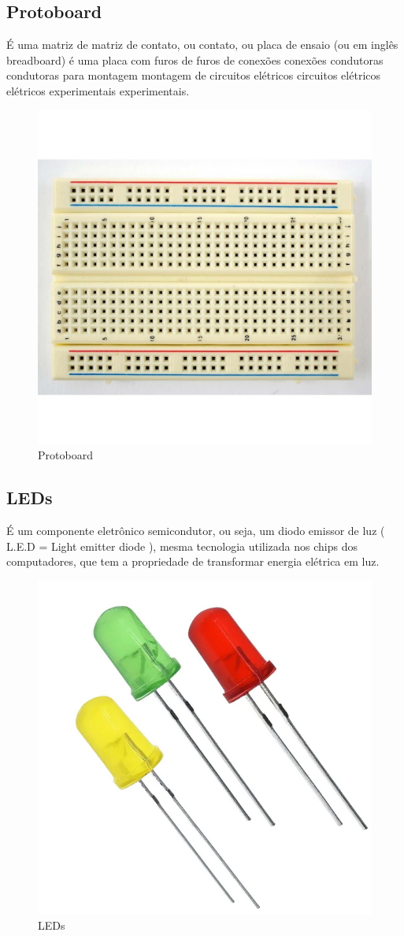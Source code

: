 \documentclass[12pt]{article}
\begin{document}
\subsection{Protoboard}
É uma matriz de matriz de contato, ou contato, ou placa de ensaio (ou em inglês breadboard)
é uma placa com furos de furos de conexões conexões condutoras condutoras para montagem montagem de
circuitos elétricos circuitos elétricos elétricos experimentais experimentais.


\begin{figure}[ht]
  \centering
  \includegraphics[width=.5\textwidth]{Images/protoboard.jpg}
  \caption{Protoboard}
  \label{fig:exampleProtoboard}
\end{figure}

\subsection{LEDs}
É  um componente eletrônico semicondutor, ou seja, um diodo emissor de luz ( L.E.D = Light emitter diode ),
mesma tecnologia utilizada nos chips dos computadores, que tem a propriedade de transformar energia elétrica em luz.

\begin{figure}[ht]
  \centering
  \includegraphics[width=.45\textwidth]{Images/LEDs.jpg}
  \caption{LEDs}
  \label{fig:exampleLEDs}
\end{figure}
\end{document}
